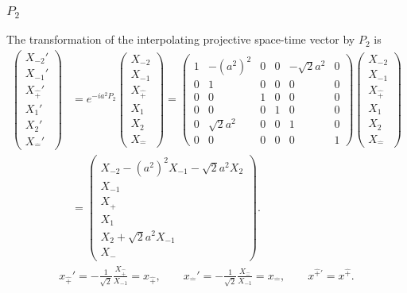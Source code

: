 \documentclass[foundations,article,submit,pdftex,moreauthors]{Definitions/mdpi}
\begin{document}
\subsubsection{\texorpdfstring{$P_{2}$}{P2}}

The transformation of the interpolating projective space-time vector by
$P_2$ is
\begin{align}
\begin{pmatrix}
X_{-2}'\\ X_{-1}'\\ X_{\hat{+}}'\\ X_1'\\ X_2'\\ X_{\hat{-}}'
\end{pmatrix}
&=e^{-ia^2P_2}
\begin{pmatrix}
X_{-2}\\ X_{-1}\\ X_{\hat{+}}\\ X_1\\ X_2\\ X_{\hat{-}}
\end{pmatrix}
=\begin{pmatrix}
1 & - (a^{2})^{2} & 0 & 0 & - \sqrt{2} a^{2} & 0\\
0 & 1 & 0 & 0 & 0 & 0\\
0 & 0 & 1 & 0 & 0 & 0\\
0 & 0 & 0 & 1 & 0 & 0\\
0 & \sqrt{2} a^{2} & 0 & 0 & 1 & 0\\
0 & 0 & 0 & 0 & 0 & 1
\end{pmatrix}
\begin{pmatrix}
X_{-2}\\ X_{-1}\\ X_{\hat{+}}\\ X_1\\ X_2\\ X_{\hat{-}}
\end{pmatrix}\\
&=\begin{pmatrix}
X_{-2}-(a^2)^2X_{-1}-\sqrt{2}a^2X_2\\
X_{-1}\\ X_{\hat{+}}\\ X_1\\ X_2+\sqrt{2}a^2X_{-1}\\ X_{\hat{-}}
\end{pmatrix}.
\end{align}
\begin{align}
x_{\hat{+}}'=-\frac{1}{\sqrt{2}}\frac{X_{\hat{+}}}{X_{-1}}=x_{\hat{+}},\qquad
x_{\hat{-}}'=-\frac{1}{\sqrt{2}}\frac{X_{\hat{-}}}{X_{-1}}=x_{\hat{-}},\qquad
x^{\hat{+}\prime}=x^{\hat{+}}.
\end{align}
\end{document}

